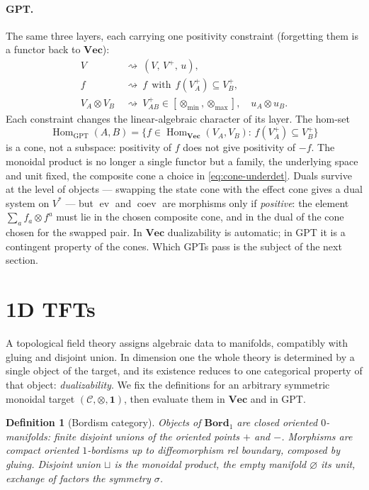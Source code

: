 \documentclass[prl,aps,10pt,superscriptaddress, floatfix]{revtex4-2}
\newtheorem*{defi}{Definition}
\begin{document}
\paragraph{GPT.}
The same three layers, each carrying one positivity constraint (forgetting them is a functor back to $\mathbf{Vec}$):
\[
\begin{aligned}
V\ &\rightsquigarrow\ (V,\,V^+,\,u),\\
f\ &\rightsquigarrow\ f\ \ \text{with}\ \ f(V_A^+)\subseteq V_B^+,\\
V_A\otimes V_B\ &\rightsquigarrow\ V_{AB}^+\in[\otimes_{\min},\otimes_{\max}],\quad u_A\otimes u_B.
\end{aligned}
\]
Each constraint changes the linear-algebraic character of its layer. The hom-set
\[
\operatorname{Hom}_{\mathrm{GPT}}(A,B)=\{f\in\operatorname{Hom}_{\mathbf{Vec}}(V_A,V_B):\,f(V_A^+)\subseteq V_B^+\}
\]
is a cone, not a subspace: positivity of $f$ does not give positivity of $-f$. The monoidal product is no longer a single functor but a family, the underlying space and unit fixed, the composite cone a choice in \eqref{eq:cone-underdet}. Duals survive at the level of objects --- swapping the state cone with the effect cone gives a dual system on $V^*$ --- but $\operatorname{ev}$ and $\operatorname{coev}$ are morphisms only if \emph{positive}: the element $\sum_af_a\otimes f^a$ must lie in the chosen composite cone, and in the dual of the cone chosen for the swapped pair. In $\mathbf{Vec}$ dualizability is automatic; in GPT it is a contingent property of the cones. Which GPTs pass is the subject of the next section.

\section{1D TFTs}

A topological field theory assigns algebraic data to manifolds, compatibly with gluing and disjoint union. In dimension one the whole theory is determined by a single object of the target, and its existence reduces to one categorical property of that object: \emph{dualizability}. We fix the definitions for an arbitrary symmetric monoidal target $(\mathcal C,\otimes,\mathbf 1)$, then evaluate them in $\mathbf{Vec}$ and in GPT.

\begin{defi}[Bordism category]
Objects of $\mathbf{Bord}_1$ are closed oriented $0$-manifolds: finite disjoint unions of the oriented points $+$ and $-$. Morphisms are compact oriented $1$-bordisms up to diffeomorphism rel boundary, composed by gluing. Disjoint union $\sqcup$ is the monoidal product, the empty manifold $\varnothing$ its unit, exchange of factors the symmetry $\sigma$.
\end{defi}
\end{document}
